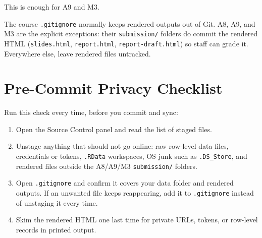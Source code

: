 \documentclass[
  letterpaper,
  DIV=11,
  numbers=noendperiod,
  oneside]{scrreprt}
\providecommand{\tightlist}{%
  \setlength{\itemsep}{0pt}\setlength{\parskip}{0pt}}
\begin{document}
This is enough for A9 and M3.

\begin{tcolorbox}[enhanced jigsaw, title=\textcolor{quarto-callout-note-color}{\faInfo}\hspace{0.5em}{Rendered HTML: the one exception}, arc=.35mm, toptitle=1mm, colframe=quarto-callout-note-color-frame, toprule=.15mm, leftrule=.75mm, bottomtitle=1mm, opacityback=0, bottomrule=.15mm, coltitle=black, breakable, opacitybacktitle=0.6, titlerule=0mm, colback=white, left=2mm, colbacktitle=quarto-callout-note-color!10!white, rightrule=.15mm]

The course \texttt{.gitignore} normally keeps rendered outputs out of
Git. A8, A9, and M3 are the explicit exceptions: their
\texttt{submission/} folders do commit the rendered HTML
(\texttt{slides.html}, \texttt{report.html}, \texttt{report-draft.html})
so staff can grade it. Everywhere else, leave rendered files untracked.

\end{tcolorbox}

\section*{Pre-Commit Privacy
Checklist}\label{pre-commit-privacy-checklist}


Run this check every time, before you commit and sync:

\begin{enumerate}
\def\labelenumi{\arabic{enumi}.}
\tightlist
\item
  Open the Source Control panel and read the list of staged files.
\item
  Unstage anything that should not go online: raw row-level data files,
  credentials or tokens, \texttt{.RData} workspaces, OS junk such as
  \texttt{.DS\_Store}, and rendered files outside the A8/A9/M3
  \texttt{submission/} folders.
\item
  Open \texttt{.gitignore} and confirm it covers your data folder and
  rendered outputs. If an unwanted file keeps reappearing, add it to
  \texttt{.gitignore} instead of unstaging it every time.
\item
  Skim the rendered HTML one last time for private URLs, tokens, or
  row-level records in printed output.
\end{enumerate}
\end{document}
